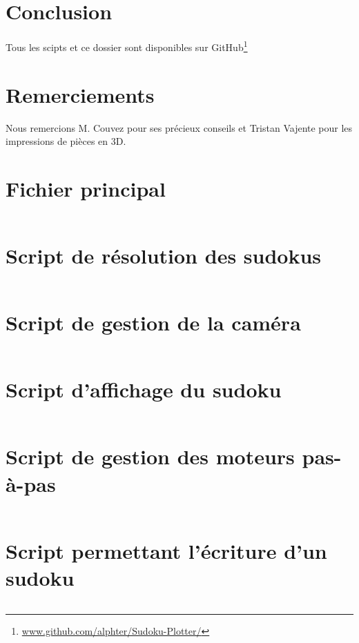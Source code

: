 \documentclass[12pt,a4paper]{report}
\newenvironment{changemargin}[2]{\begin{list}{}{%
\setlength{\topsep}{0pt}%
\setlength{\leftmargin}{0pt}%
\setlength{\rightmargin}{0pt}%
\setlength{\listparindent}{\parindent}%
\setlength{\itemindent}{\parindent}%
\setlength{\parsep}{0pt plus 1pt}%
\addtolength{\leftmargin}{#1}%
\addtolength{\rightmargin}{#2}%
}\item }{\end{list}}
\begin{document}
\chapter*{Conclusion}
Tous les scipts et ce dossier sont disponibles sur GitHub\footnote{\url{www.github.com/alphter/Sudoku-Plotter/}}

\chapter*{Remerciements}

Nous remercions M. Couvez pour ses précieux conseils et Tristan Vajente pour les impressions de pièces en 3D.

\printbibliography
\nocite{*}
\appendix
\begin{changemargin}{-2cm}{-4cm}
\chapter{Fichier principal}
\label{main}
\inputminted[fontsize=\scriptsize, linenos=true]{Python}{../script/main.py}
\chapter{Script de résolution des sudokus}
\label{resolution}
\inputminted[fontsize=\scriptsize, linenos=true]{Python}{../script/resolution.py}
\chapter{Script de gestion de la caméra}
\label{camera}
\inputminted[fontsize=\scriptsize, linenos=true]{Python}{../script/camera.py}
\chapter{Script d'affichage du sudoku}
\label{display}
\inputminted[fontsize=\scriptsize, linenos=true]{Python}{../script/display.py}
\chapter{Script de gestion des moteurs pas-à-pas}
\label{step_motor}
\inputminted[fontsize=\scriptsize, linenos=true]{Python}{../script/step_motor.py}
\chapter{Script permettant l'écriture d'un sudoku}
\label{write}
\inputminted[fontsize=\scriptsize, linenos=true]{Python}{../script/write.py}

\end{changemargin}
\end{document}
